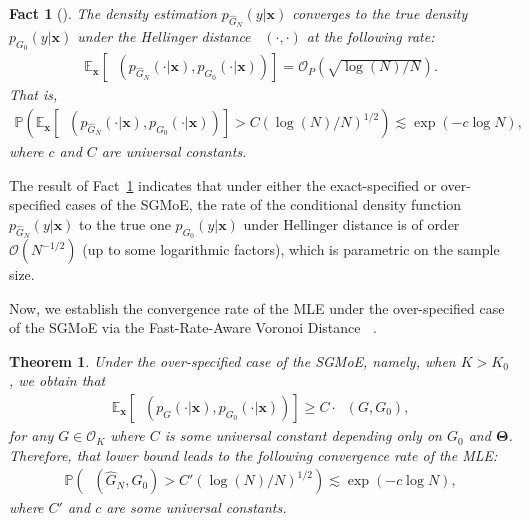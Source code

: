 \documentclass[twoside]{article}
\DeclareMathOperator*{\VDFRA}{D_{FRA}}
\DeclareMathOperator*{\hels}{D_{h}^2}
\theoremstyle{plain}
\newtheorem{theorem}{Theorem}
\newtheorem{fact}{Fact}
\theoremstyle{definition}
\theoremstyle{plain}
\def\rvx{{\mathbf{x}}}
\def\vTheta{{\bm{\Theta}}}
\def\vx{{\bm{x}}}
\def\sP{{\mathbb{P}}}
\newcommand{\bbE}{\mathbb{E}}
\begin{document}
\begin{fact}[{\citealp[Proposition 2]{nguyen_demystifying_2023}}]
\label{prop_rate_density} 
The density estimation $p_{\widehat{G}_{N}}(y| \vx)$ converges to the true density $p_{G_0}(y| \vx)$ under the Hellinger distance $\hels(\cdot,\cdot)$ at the following rate:
\begin{align*}
    \bbE_\rvx[\hels(p_{\widehat{G}_{N}}(\cdot|\vx), p_{G_{0}}(\cdot|\vx))] = \mathcal{O}_P( \sqrt{\log(N)/N}).
\end{align*}
That is,
\begin{align*}
    \mathbb{P}(\bbE_\rvx[\hels(p_{\widehat{G}_{N}}(\cdot|\vx), p_{G_{0}}(\cdot|\vx))] > C (\log(N)/N)^{1/2}) \lesssim \exp(-c \log N),
\end{align*}
where $c$ and $C$ are universal constants. 
\end{fact}

The result of Fact~\ref{prop_rate_density} indicates that under either the exact-specified or over-specified cases of the SGMoE, the rate of the conditional density function $p_{\widehat{G}_{N}}(y| \vx)$ to the true one $p_{G_{0}}(y| \vx)$ under Hellinger distance is of order $\mathcal{O}(N^{-1/2})$ (up to some logarithmic factors), which is parametric on the sample size.

Now, we establish the convergence rate of the MLE under the over-specified case of the SGMoE via the Fast-Rate-Aware Voronoi Distance $\VDFRA$.

\begin{theorem}\label{theorem:convergence_rate_of_parameters}
    Under the over-specified case of the SGMoE, namely, when $K > K_0$, we obtain that
    \begin{align}
        \mathbb{E}_{\rvx} [\hels (p_{G} (\cdot | \vx), p_{G_0} (\cdot | \vx))] \geq C \cdot \VDFRA (G, G_0), \nonumber
    \end{align}
    for any $G \in \mathcal{O}_K$ where $C$ is some universal constant depending only on $G_0$ and $\vTheta$. Therefore, that lower bound leads to the following convergence rate of the MLE:
    \begin{align}
        \sP (\VDFRA (\widehat{G}_N, G_0) > C' (\log (N)/N)^{1/2}) \lesssim \exp (-c \log N),
    \end{align}\label{theorem_convergence_rate_of_D_A}
    where $C'$ and $c$ are some universal constants.
\end{theorem}
\end{document}
